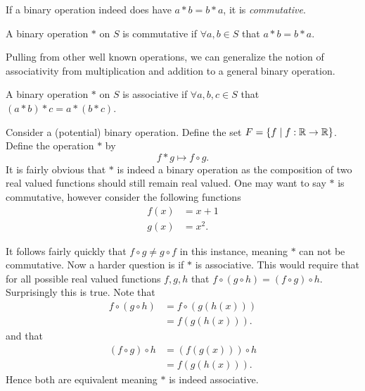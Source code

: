\documentclass[../notes.tex]{subfiles}
\begin{document}
If a binary operation indeed does have $a * b = b * a$, it is \textit{commutative}.

\begin{definition}
	A binary operation $*$ on $S$ is commutative if $\forall a,b \in S$ that $a * b = b * a$.
\end{definition}

Pulling from other well known operations, we can generalize the notion of associativity from multiplication and addition to a general binary operation.

\begin{definition}[Associativity]
	A binary operation $*$ on $S$ is associative if $\forall a,b,c \in S$ that $(a * b) * c = a * (b * c)$.
\end{definition}

\begin{example}
Consider a (potential) binary operation. Define the set $F = \qty{f \;|\; f : \mathbb{R} \to \mathbb{R}}$. Define the operation $*$ by
\[
	f * g \mapsto f \circ g
.\]
It is fairly obvious that $*$ is indeed a binary operation as the composition of two real valued functions should still remain real valued. One may want to say $*$ is commutative, however consider the following functions
\begin{align*}
	f(x) &= x + 1 \\
	g(x) &= x^2
.\end{align*}

It follows fairly quickly that $f\circ g \neq g\circ f$ in this instance, meaning $*$ can not be commutative. Now a harder question is if $*$ is associative. This would require that for all possible real valued functions $f,g,h$ that $f\circ (g \circ h) = (f \circ g) \circ h$. Surprisingly this is true. Note that
\begin{align*}
	f\circ (g \circ h) &= f \circ (g(h(x))) \\
										 &= f(g(h(x)))
.\end{align*}
and that
\begin{align*}
	(f \circ g) \circ h &= (f(g(x))) \circ h \\
											&= f(g(h(x)))
.\end{align*}
Hence both are equivalent meaning $*$ is indeed associative.
\end{example}
\end{document}
